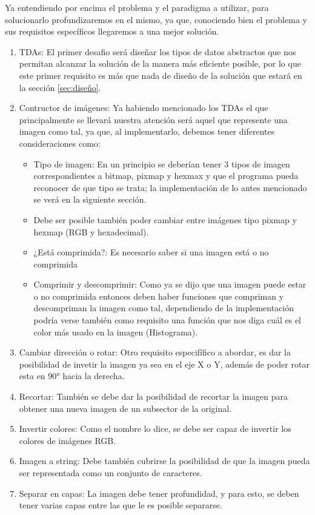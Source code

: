 Ya entendiendo  por encima el problema y el paradigma a utilizar, para solucionarlo profundizaremos
 en el mismo, ya que, conociendo bien el problema y sus requisitos específicos llegaremos
 a una mejor solución.

\begin{enumerate}
    \item TDAs: El primer desafio será diseñar los tipos de datos abstractos que nos permitan alcanzar la solución de la manera más
    eficiente posible, por lo que este primer requisito es más que nada de diseño de la solución que estará en la sección \ref{sec:diseño}.
    \item Contructor de imágenes: Ya habiendo mencionado los TDAs el que principalmente se llevará nuestra atención será aquel que 
    represente una imagen como tal, ya que, al implementarlo, debemos tener diferentes consideraciones como:
    \begin{itemize}
        \item Tipo de imagen: En un principio se deberían tener 3 tipos de imagen correspondientes a bitmap, pixmap y hexmax y que
        el programa pueda reconocer de que tipo se trata; la implementación de lo antes mencionado se verá en la siguiente sección.
        \item Debe ser posible también poder cambiar entre imágenes tipo pixmap y hexmap (RGB y hexadecimal).
        \item ¿Está comprimida?: Es necesario saber si una imagen está o no comprimida
        \item Comprimir y descomprimir: Como ya se dijo que una imagen puede estar o no comprimida entonces deben haber funciones que compriman
     y descompriman la imagen como tal, dependiendo de la implementación podría verse también como requisito una función que nos diga 
     cuál es el color más usado en la imagen (Histograma).
    \end{itemize}
    
    \item Cambiar dirección o rotar: Otro requisito especifífico a abordar, es dar la posibilidad de invetir la imagen ya sea en el eje X o Y, 
    además de poder rotar esta en 90° hacia la derecha.
    \item Recortar: También se debe dar la posibilidad de recortar la imagen para obtener una nueva imagen de un subsector de la original.
    \item Invertir colores: Como el nombre lo dice, se debe ser capaz de invertir los colores de imágenes RGB.
    \item Imagen a string: Debe también cubrirse la posibilidad de que la imagen pueda ser representada como un conjunto de caracteres.
    \item Separar en capas: La imagen debe tener profundidad, y para esto, se deben tener varias capas entre las que le es posible separarse.
\end{enumerate}
